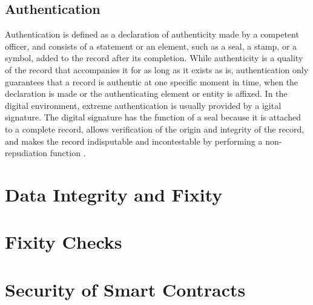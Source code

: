 \subsection{Authentication}
Authentication is defined as a declaration of authenticity made by a competent officer, and consists of a statement or an element, such as a seal, a stamp, or a symbol, added to the record after its completion. While authenticity is a quality of the record that accompanies it for as long as it exists as is, authentication only guarantees that a record is authentic at one specific moment in time, when the declaration is made or the authenticating element or entity is affixed. In the digital environment, extreme authentication is usually provided by a  igital signature. The digital signature has the function of a seal because it is attached to a complete record, allows verification of the origin and integrity of the record, and makes the record indisputable and incontestable by performing a non-repudiation function \cite[53]{duranti2009digital}.

\section{Data Integrity and Fixity}
\section{Fixity Checks}
\section{Security of Smart Contracts}
